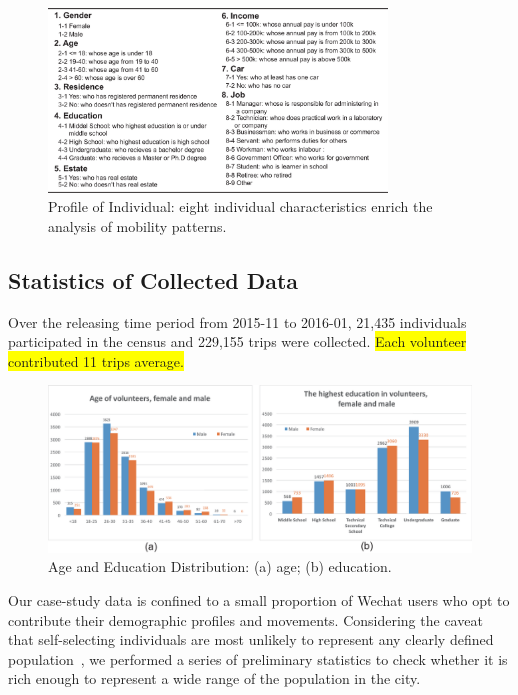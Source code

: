 \documentclass{ieeeaccess}
\begin{document}
\begin{figure}
 \centering
 \includegraphics[width=9cm]{pictures/data_over}
 \captionsetup{justification=centering}
 \caption{Profile of Individual: eight individual characteristics enrich the analysis of mobility patterns.}
 \label{fig:data_over}
\end{figure}



\subsection{Statistics of Collected Data}

Over the releasing time period from 2015-11 to 2016-01, 21,435 individuals participated in the census and 229,155 trips were collected. \colorbox{yellow}{Each volunteer contributed 11 trips average.}

\begin{figure}[htb!]
 \centering %
 \includegraphics[width=\columnwidth]{pictures/data1}
 \caption{Age and Education Distribution: (a) age; (b) education.}
 \label{fig:data_age_edu}
\end{figure}

Our case-study data is confined to a small proportion of Wechat users who opt to contribute their demographic profiles and movements.
Considering the caveat that self-selecting individuals are most unlikely to represent any clearly defined population~\cite{Longley2015}, we performed a series of preliminary statistics to check whether it is rich enough to represent a wide range of the population in the city.
\end{document}
